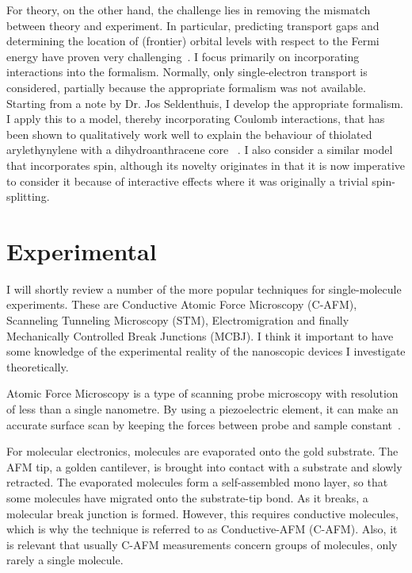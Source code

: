 For theory, on the other hand, the challenge lies in removing the mismatch between theory and experiment. In particular, predicting transport gaps and determining the location of (frontier) orbital levels with respect to the Fermi energy have proven very challenging~\cite{perrin}. I focus primarily on incorporating interactions into the formalism. Normally, only single-electron transport is considered, partially because the appropriate formalism  was not available. Starting from a note by Dr. Jos Seldenthuis, I develop the appropriate formalism. I apply this to a model, thereby incorporating Coulomb interactions, that has been shown to qualitatively work well to explain the behaviour of thiolated arylethynylene with a dihydroanthracene core ~\cite{perrinnano}. I also consider a similar model that incorporates spin, although its novelty originates in that it is now imperative to consider it because of interactive effects where it was originally a trivial spin-splitting. 
\section{Experimental}
I will shortly review a number of the more popular techniques for single-molecule experiments. These are Conductive Atomic Force Microscopy (C-AFM), Scanneling Tunneling Microscopy (STM), Electromigration and finally Mechanically Controlled Break Junctions (MCBJ). I think it important to have some knowledge of the experimental reality of the nanoscopic devices I investigate theoretically.

Atomic Force Microscopy is a type of scanning probe microscopy with resolution of less than a single nanometre. By using a piezoelectric element, it can make an accurate surface scan by keeping the forces between probe and sample constant~\cite{frei1, frei2}.

For molecular electronics, molecules are evaporated onto the gold substrate. The AFM tip, a golden cantilever, is brought into contact with a substrate and slowly retracted. The evaporated molecules form a self-assembled mono layer, so that some molecules have migrated onto the substrate-tip bond. As it breaks, a molecular break junction is formed. However, this requires conductive molecules, which is why the technique is referred to as Conductive-AFM (C-AFM). Also, it is relevant that usually C-AFM measurements concern groups of molecules, only rarely a single molecule.

